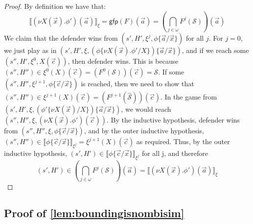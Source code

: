 \documentclass[10pt,a4paper]{article}
\theoremstyle{definition}
\theoremstyle{remark}
\newcommand\sem[2][\xi]{\llbracket#2\rrbracket_{#1}}
\newcommand\Scal{\mathcal{S}}
\newcommand\gfp{\mathsf{gfp}}
\newcommand\fstates[0]{\hat{\Scal}}
\begin{document}
\begin{proof}
	By definition we have that:
	\[
		\sem{(\nu X(\vec x).\phi')(\vec a)} = \gfp(F)(\vec a) = (\bigcap_{j \in \omega} F^j(\Scal))(\vec a)
	\]
	We claim that the defender wins from $(s', H', \xi^j,\phi\{\vec a / \vec x\})$ for all $j$. 
	For $j = 0$, we just play as in $(s', H', \xi, (\phi\{\nu X(\vec x).\phi' / X\})\{\vec a / \vec x\})$, and if we reach some $(s'', H', \xi^0, X(\vec c))$, then defender wins. 
	This is because $(s'', H'') \in \xi^0(X)(\vec c) = (F^0(\Scal))(\vec c) = \Scal$. 
	If some $(s'', H'', \xi^{j + 1}, \phi\{\vec c / \vec x\})$ is reached, then we need to show that $(s'', H'')\in \xi^{j+1}(X)(\vec c) = (F^{j + 1}(\fstates))(\vec c)$. 
	In the game from $(s', H', \xi, (\phi'\{\nu X(\vec x) / X\})\{\vec a / \vec x\})$, we would reach $(s'', H'', \xi, (\nu X(\vec x).\phi')(\vec c))$. 
	By the inductive hypothesis, defender wins from $(s'', H'',\xi, \phi\{\vec c / \vec x\})$, and by the outer inductive hypothesis, $(s'', H'')\in \sem[\xi^j]{\phi\{\vec c / \vec x\}} = \xi^{j + 1}(X)(\vec c)$ as required.
	Thus, by the outer inductive hypothesis, $(s', H')\in \sem[\xi^j]{\phi\{\vec c / \vec x\}}$ for all j, and therefore 
	\[
	(s', H')\in (\bigcap_{j \in \omega}F^j(\Scal))(\vec a) = \sem{(\nu X(\vec x).\phi')(\vec a)}
	\]
\end{proof}


\subsection{Proof of \cref{lem:boundingisnombisim}}
\end{document}
